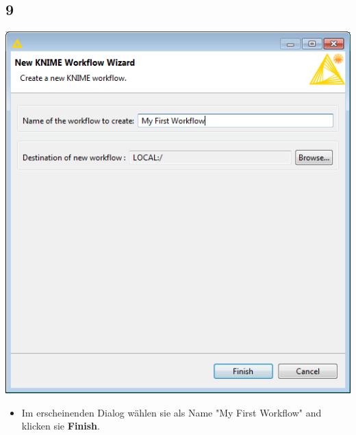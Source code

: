 \documentclass{beamer}
\begin{document}
\subsection{9}
\begin{frame}
	\begin{center}
  		\includegraphics[height=0.6\textheight]{9.png}
	\end{center}
	\begin{itemize}
		\item Im erscheinenden Dialog wählen sie als Name "My First Workflow" and klicken sie \textbf{Finish}.		
	\end{itemize}
\end{frame}
\end{document}
